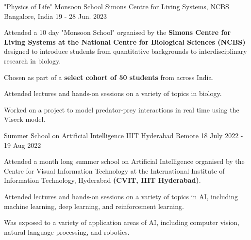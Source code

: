 



\begin{cventries}

  \cventry
    {"Physics of Life" Monsoon School} %
    {Simons Centre for Living Systems, NCBS} %
    {Bangalore, India} %
    {19 - 28 Jun. 2023} %
    {
      \begin{cvitems} %
        \item {Attended a 10 day "Monsoon School" organised by the \textbf{Simons Centre for
        Living  Systems at the National Centre for Biological Sciences (NCBS)} designed to
        introduce students from quantitative backgrounds to interdisciplinary research in
        biology.}
        \item {Chosen as part of a \textbf{select cohort of 50 students} from across India.}
        \item {Attended lectures and hands-on sessions on a variety of topics in biology.}
        \item {Worked on a project to model predator-prey interactions in real time using
        the Viscek model.}
      \end{cvitems}
    }

  \cventry
    {Summer School on Artificial Intelligence} %
    {IIIT Hyderabad} %
    {Remote} %
    {18 July 2022 - 19 Aug 2022} %
    {
      \begin{cvitems} %
        \item {Attended a month long summer school on Artificial Intelligence organised
        by the Centre for Visual Information Technology at the International Institute of 
        Information Technology, Hyderabad \textbf{(CVIT, IIIT Hyderabad)}.}
        \item {Attended lectures and hands-on sessions on a variety of topics in AI, 
        including machine learning, deep learning, and reinforcement learning.}
        \item {Was exposed to a variety of application areas of AI, including 
        computer vision, natural language processing, and robotics.}
      \end{cvitems}
    }
\end{cventries}
